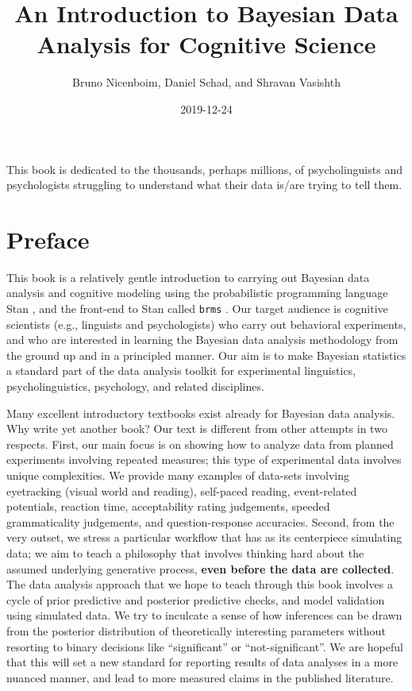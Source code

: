 \documentclass[12pt,]{krantz}
\title{An Introduction to Bayesian Data Analysis for Cognitive Science}
\author{Bruno Nicenboim, Daniel Schad, and Shravan Vasishth}
\date{2019-12-24}
\theoremstyle{definition}
\theoremstyle{definition}
\theoremstyle{definition}
\theoremstyle{remark}
\begin{document}
\maketitle

\thispagestyle{empty}
\begin{center}
This book is dedicated to the thousands, perhaps millions, of psycholinguists and psychologists struggling to understand what their data is/are trying to tell them.
\end{center}

\setlength{\abovedisplayskip}{-5pt}
\setlength{\abovedisplayshortskip}{-5pt}

{
\hypersetup{linkcolor=}
\setcounter{tocdepth}{2}
\tableofcontents
}
\listoftables
\listoffigures
\hypertarget{preface}{%
\chapter*{Preface}\label{preface}}


This book is a relatively gentle introduction to carrying out Bayesian data analysis and cognitive modeling using the probabilistic programming language Stan \citep{carpenter2017stan}, and the front-end to Stan called \texttt{brms} \citep{R-brms}. Our target audience is cognitive scientists (e.g., linguists and psychologists) who carry out behavioral experiments, and who are interested in learning the Bayesian data analysis methodology from the ground up and in a principled manner. Our aim is to make Bayesian statistics a standard part of the data analysis toolkit for experimental linguistics, psycholinguistics, psychology, and related disciplines.

Many excellent introductory textbooks exist already for Bayesian data analysis. Why write yet another book? Our text is different from other attempts in two respects. First, our main focus is on showing how to analyze data from planned experiments involving repeated measures; this type of experimental data involves unique complexities. We provide many examples of data-sets involving eyetracking (visual world and reading), self-paced reading, event-related potentials, reaction time, acceptability rating judgements, speeded grammaticality judgements, and question-response accuracies. Second, from the very outset, we stress a particular workflow that has as its centerpiece simulating data; we aim to teach a philosophy that involves thinking hard about the assumed underlying generative process, \textbf{even before the data are collected}. The data analysis approach that we hope to teach through this book involves a cycle of prior predictive and posterior predictive checks, and model validation using simulated data. We try to inculcate a sense of how inferences can be drawn from the posterior distribution of theoretically interesting parameters without resorting to binary decisions like ``significant'' or ``not-significant''. We are hopeful that this will set a new standard for reporting results of data analyses in a more nuanced manner, and lead to more measured claims in the published literature.
\end{document}
